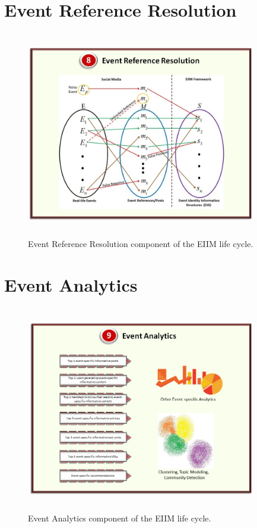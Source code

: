 \section{Event Reference Resolution}

\begin{figure}[htbp]
  \caption{Event Reference Resolution component of the EIIM life cycle.}
  \centering
    \includegraphics[width=10cm,height=9cm]{Figures/EIIMComponents/EventReferenceResolution.jpg}
\end{figure}

\section{Event Analytics}
\begin{figure}[htbp]
  \caption{Event Analytics component of the EIIM life cycle.}
  \centering
    \includegraphics[width=10cm,height=9cm]{Figures/EIIMComponents/EventAnalytics.jpg}
\end{figure}